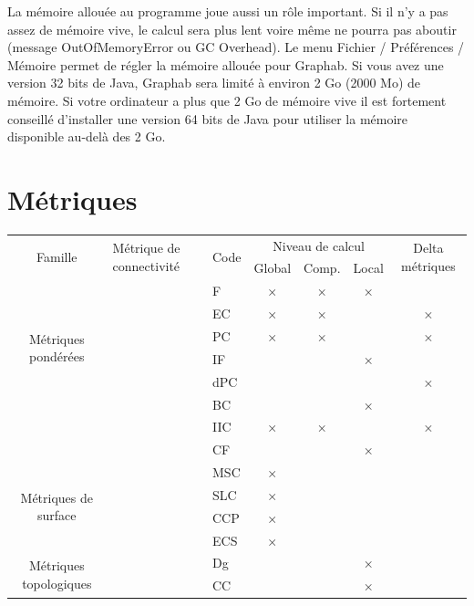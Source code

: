 \documentclass{article}
\begin{document}
La mémoire allouée au programme joue aussi un rôle important. Si il n’y a pas assez de mémoire vive, le calcul sera plus lent voire même ne pourra pas aboutir (message OutOfMemoryError ou GC Overhead). Le menu Fichier / Préférences / Mémoire permet de régler la mémoire allouée pour Graphab. Si vous avez une version 32 bits de Java, Graphab sera limité à environ 2 Go (2000 Mo) de mémoire. Si votre ordinateur a plus que 2 Go de mémoire vive il est fortement conseillé d’installer une version 64 bits de Java pour utiliser la mémoire disponible au-delà des 2 Go.


\section{Métriques}

\begin{table}[H]
	\begin{tabular}{|c|p{7cm}|l|c|c|c|c|}
		\hline
		\multirow{2}{*}{Famille} & \multirow{2}{*}{Métrique de connectivité} & \multirow{2}{*}{Code} & \multicolumn{3}{m{3cm}|}{\centering Niveau de calcul} & \multirow{2}{1.5cm}{Delta métriques}\\
		\hhline{~~~---~}
		&  &  & Global & Comp. & Local & \\
		\hline
		\multirow{6}{2cm}{Métriques pondérées}
		& \nameref{metric_F} & F & × & × & × & \\
		& \nameref{metric_EC} & EC & × & × &  & ×\\
		& \nameref{metric_PC} & PC & × & × &  & ×\\
		& \nameref{metric_IF} & IF &  &  & × & \\
		& \nameref{metric_dPC} & dPC &  &  &  & ×\\
		& \nameref{metric_BC} & BC &  &  & × & \\
		& \nameref{metric_IIC} & IIC & × & × &  & ×\\
		& \nameref{metric_CF} & CF &  &  & × & \\
		\hline
		\multirow{4}{2cm}{Métriques de surface}
		& \nameref{metric_MSC} & MSC & × &  &  & \\
		& \nameref{metric_SLC} & SLC & × &  &  & \\
		& \nameref{metric_CCP} & CCP & × &  &  & \\
		& \nameref{metric_ECS} & ECS & × &  &  & \\
		\hline
		\multirow{9}{2cm}{Métriques topologiques}
		& \nameref{metric_Dg} & Dg &  &  & × & \\
		& \nameref{metric_CC} & CC &  &  & × & \\

\end{tabular}
\end{table}
\end{document}
